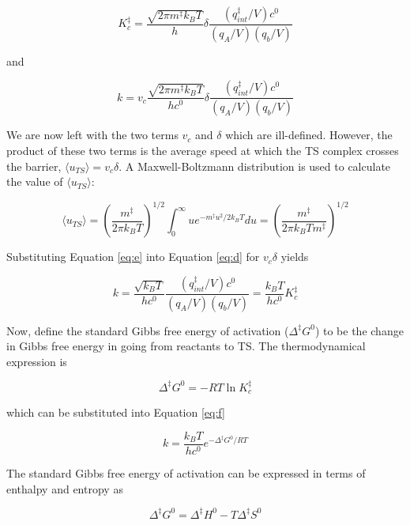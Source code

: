 \begin{equation}
  K_c^{\ddagger} =  \frac{\sqrt{2\pi m^\ddagger k_BT}}{h}\delta\frac{(q_{int}^\ddagger/V)c^0}{(q_A/V)(q_b/V)}
\end{equation}

\noindent and

\begin{equation}
 k = v_c \frac{\sqrt{2\pi m^\ddagger
     k_BT}}{hc^0}\delta\frac{(q_{int}^\ddagger/V)c^0}{(q_A/V)(q_b/V)}
\label{eq:d}
\end{equation}

We are now left with the two terms $v_c$ and $\delta$ which are ill-defined. However, the product of these two terms is the average speed at which the TS complex crosses the barrier, $\langle u_{TS} \rangle = v_c\delta$. A Maxwell-Boltzmann distribution is used to calculate the value of $\langle u_{TS} \rangle$:

\begin{equation}
  \langle u_{TS} \rangle = \left( \frac{m^\ddagger}{2\pi k_BT} \right)^{1/2}
  \int_0^\infty u e^{-m^\ddagger u^2/2k_BT}du = \left( \frac{m^\ddagger}{2\pi
      k_BT m^\ddagger} \right)^{1/2}
\label{eq:e}
\end{equation}

\noindent Substituting Equation \ref{eq:e} into Equation \ref{eq:d} for $v_c\delta$ yields

\begin{equation}
  k =
  \frac{\sqrt{k_BT}}{hc^0}\frac{(q_{int}^\ddagger/V)c^0}{(q_A/V)(q_b/V)} = \frac{k_BT}{hc^0}K_c^\ddagger
\label{eq:f}
\end{equation}

Now, define the standard Gibbs free energy of activation ($\Delta ^\ddagger G^0$) to be the change in Gibbs free energy in going from reactants to TS. The thermodynamical expression is

\begin{equation}
  \Delta ^\ddagger G^0 = -RT \ln K_c^\ddagger
\end{equation}

\noindent which can be substituted into Equation \ref{eq:f}

\begin{equation}
  k = \frac{k_BT}{hc^0} e^{-\Delta^\ddagger G^0/RT}
\label{eq:g}
\end{equation}

The standard Gibbs free energy of activation can be expressed in terms of enthalpy and entropy as

\begin{equation}
  \Delta^\ddagger G^0 = \Delta^\ddagger H^0 - T \Delta^\ddagger S^0
\end{equation}

